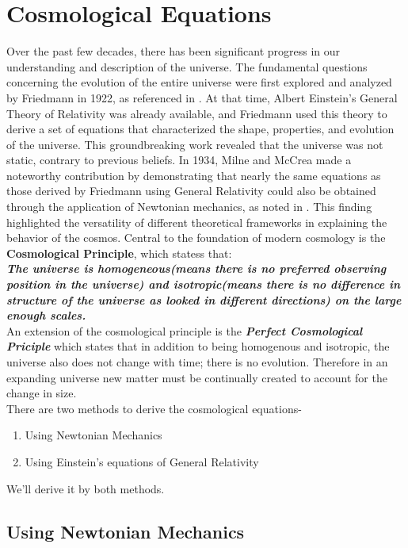 \documentclass[12pt]{article}
\begin{document}
\section{Cosmological Equations}\label{II}

Over the past few decades, there has been significant progress in our understanding and description of the universe. The fundamental questions concerning the evolution of the entire universe were first explored and analyzed by Friedmann in 1922, as referenced in \cite{garcia-bellido_evolution_universe, soloviev_friedmann_einstein}. At that time, Albert Einstein's General Theory of Relativity was already available, and Friedmann used this theory to derive a set of equations that characterized the shape, properties, and evolution of the universe. This groundbreaking work revealed that the universe was not static, contrary to previous beliefs.
In 1934, Milne and McCrea made a noteworthy contribution by demonstrating that nearly the same equations as those derived by Friedmann using General Relativity could also be obtained through the application of Newtonian mechanics, as noted in \cite{ec3dce9b-606e-3531-a56c-89ea944f0c69, 10.1093/qmath/os-5.1.73, NEU, McCREA1955}. This finding highlighted the versatility of different theoretical frameworks in explaining the behavior of the cosmos.
Central to the foundation of modern cosmology is the \textbf{Cosmological Principle}, which statess that:\\
\textit{\textbf{The universe is homogeneous(means there is no preferred observing position in the universe) and isotropic(means there is no difference in structure of the universe as looked in different directions) on the large enough scales.}}\\ 
An extension of the cosmological principle is the \textit{\textbf{Perfect Cosmological Priciple}} which states that in addition to being homogenous and isotropic, the universe also does not change with time; there is no evolution. Therefore in an expanding universe new matter must be continually created to account for the change in size. \\
There are two methods to derive the cosmological equations- 
\begin{enumerate}
    \item Using Newtonian Mechanics
    \item Using Einstein's equations of General Relativity
\end{enumerate}
 We'll derive it by both methods.
\subsection{Using Newtonian Mechanics}
\end{document}
